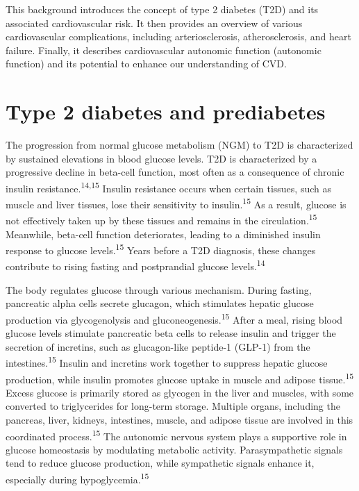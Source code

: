 \documentclass[
  letterpaper,
  headsepline=true,
  open=any]{scrbook}
\begin{document}
This background introduces the concept of type 2 diabetes (T2D) and its
associated cardiovascular risk. It then provides an overview of various
cardiovascular complications, including arteriosclerosis,
atherosclerosis, and heart failure. Finally, it describes cardiovascular
autonomic function (autonomic function) and its potential to enhance our
understanding of CVD.

\hypertarget{type-2-diabetes-and-prediabetes}{%
\section{Type 2 diabetes and
prediabetes}\label{type-2-diabetes-and-prediabetes}}

The progression from normal glucose metabolism (NGM) to T2D is
characterized by sustained elevations in blood glucose levels. T2D is
characterized by a progressive decline in beta-cell function, most often
as a consequence of chronic insulin resistance.\textsuperscript{14,15}
Insulin resistance occurs when certain tissues, such as muscle and liver
tissues, lose their sensitivity to insulin.\textsuperscript{15} As a
result, glucose is not effectively taken up by these tissues and remains
in the circulation.\textsuperscript{15} Meanwhile, beta-cell function
deteriorates, leading to a diminished insulin response to glucose
levels.\textsuperscript{15} Years before a T2D diagnosis, these changes
contribute to rising fasting and postprandial glucose
levels.\textsuperscript{14}

The body regulates glucose through various mechanism. During fasting,
pancreatic alpha cells secrete glucagon, which stimulates hepatic
glucose production via glycogenolysis and
gluconeogenesis.\textsuperscript{15} After a meal, rising blood glucose
levels stimulate pancreatic beta cells to release insulin and trigger
the secretion of incretins, such as glucagon-like peptide-1 (GLP-1) from
the intestines.\textsuperscript{15} Insulin and incretins work together
to suppress hepatic glucose production, while insulin promotes glucose
uptake in muscle and adipose tissue.\textsuperscript{15} Excess glucose
is primarily stored as glycogen in the liver and muscles, with some
converted to triglycerides for long-term storage. Multiple organs,
including the pancreas, liver, kidneys, intestines, muscle, and adipose
tissue are involved in this coordinated process.\textsuperscript{15} The
autonomic nervous system plays a supportive role in glucose homeostasis
by modulating metabolic activity. Parasympathetic signals tend to reduce
glucose production, while sympathetic signals enhance it, especially
during hypoglycemia.\textsuperscript{15}
\end{document}
